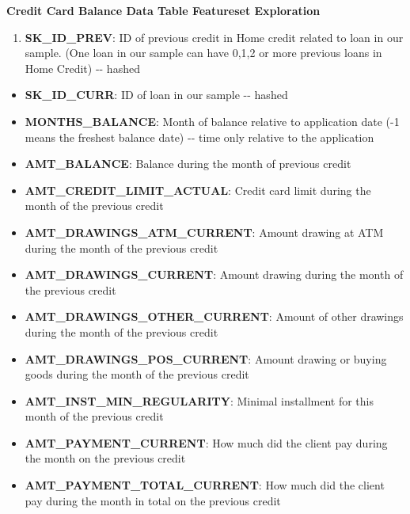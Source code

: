 \documentclass[11pt]{article}
\providecommand{\tightlist}{%
      \setlength{\itemsep}{0pt}\setlength{\parskip}{0pt}}
\begin{document}
    
    \textbf{Credit Card Balance Data Table Featureset Exploration}

\begin{enumerate}
\def\labelenumi{\arabic{enumi}.}
\tightlist
\item
  \textbf{SK\_ID\_PREV}: ID of previous credit in Home credit related to
  loan in our sample. (One loan in our sample can have 0,1,2 or more
  previous loans in Home Credit) -\/- hashed
\end{enumerate}

\begin{itemize}
\tightlist
\item
  \textbf{SK\_ID\_CURR}: ID of loan in our sample -\/- hashed
\item
  \textbf{MONTHS\_BALANCE}: Month of balance relative to application
  date (-1 means the freshest balance date) -\/- time only relative to
  the application
\item
  \textbf{AMT\_BALANCE}: Balance during the month of previous credit\\
\item
  \textbf{AMT\_CREDIT\_LIMIT\_ACTUAL}: Credit card limit during the
  month of the previous credit\\
\item
  \textbf{AMT\_DRAWINGS\_ATM\_CURRENT}: Amount drawing at ATM during the
  month of the previous credit\\
\item
  \textbf{AMT\_DRAWINGS\_CURRENT}: Amount drawing during the month of
  the previous credit\\
\item
  \textbf{AMT\_DRAWINGS\_OTHER\_CURRENT}: Amount of other drawings
  during the month of the previous credit\\
\item
  \textbf{AMT\_DRAWINGS\_POS\_CURRENT}: Amount drawing or buying goods
  during the month of the previous credit\\
\item
  \textbf{AMT\_INST\_MIN\_REGULARITY}: Minimal installment for this
  month of the previous credit\\
\item
  \textbf{AMT\_PAYMENT\_CURRENT}: How much did the client pay during the
  month on the previous credit\\
\item
  \textbf{AMT\_PAYMENT\_TOTAL\_CURRENT}: How much did the client pay
  during the month in total on the previous credit\\

\end{itemize}
\end{document}
